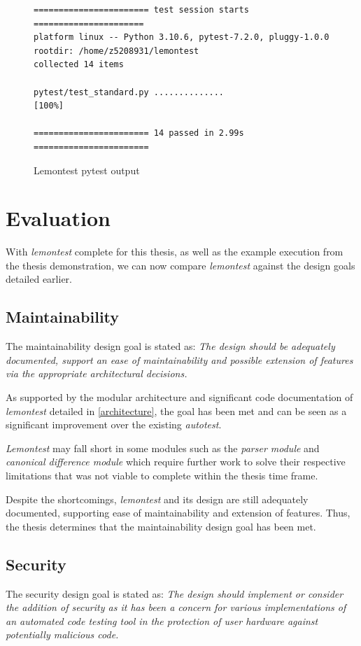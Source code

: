 \documentclass[hidelinks]{report}
\newcommand{\unchapter}[2]{
    \setcounter{chapter}{#1}
    \setcounter{section}{0}
    \chapter*{#2}
    \addcontentsline{toc}{chapter}{#2}
}
\begin{document}
\begin{figure}[h]
	\centering
	\begin{lstlisting}[breaklines=true, linewidth=\linewidth, tabsize=4]
======================= test session starts ======================
platform linux -- Python 3.10.6, pytest-7.2.0, pluggy-1.0.0
rootdir: /home/z5208931/lemontest
collected 14 items

pytest/test_standard.py ..............                      [100%]

======================= 14 passed in 2.99s =======================
	\end{lstlisting}
	\caption{Lemontest pytest output}
	\label{fig:pytest}
\end{figure}

\unchapter{6}{Evaluation}
With \textit{lemontest} complete for this thesis, as well as the example execution from the thesis demonstration, we can now compare \textit{lemontest} against the design goals detailed earlier.

\section{Maintainability}
The maintainability design goal is stated as: \textit{The design should be adequately documented, support an ease of maintainability and possible extension of features via the appropriate architectural decisions.}

As supported by the modular architecture and significant code documentation of \textit{lemontest} detailed in \autoref{architecture}, the goal has been met and can be seen as a significant improvement over the existing \textit{autotest}.

\textit{Lemontest} may fall short in some modules such as the \textit{parser module} and \textit{canonical difference module} which require further work to solve their respective limitations that was not viable to complete within the thesis time frame.

Despite the shortcomings, \textit{lemontest} and its design are still adequately documented, supporting ease of maintainability and extension of features. Thus, the thesis determines that the maintainability design goal has been met.

\section{Security}
The security design goal is stated as: \textit{The design should implement or consider the addition of security as it has been a concern for various implementations of an automated code testing tool in the protection of user hardware against potentially malicious code.}
\end{document}
